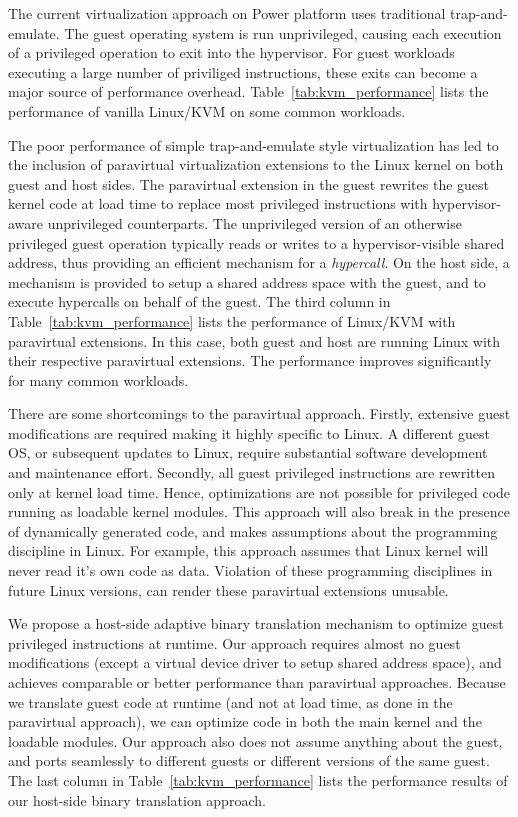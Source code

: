 \documentclass[10pt,twocolumn]{article}
\begin{document}
The current virtualization approach on Power platform uses traditional trap-and-emulate.
The guest operating system is run unprivileged, causing each execution of a privileged
operation to exit into the hypervisor. For guest workloads executing a large number
of priviliged instructions, these exits can become a major source of performance
overhead. Table~\ref{tab:kvm_performance} lists the performance of vanilla Linux/KVM
on some common workloads.

The poor performance of simple trap-and-emulate style virtualization has led to
the inclusion of paravirtual virtualization extensions to the Linux kernel on both
guest and host sides. The paravirtual extension in the guest rewrites the guest kernel
code at load time to replace most privileged instructions with
hypervisor-aware unprivileged counterparts. The unprivileged version of an
otherwise privileged guest operation typically reads or writes to a hypervisor-visible
shared address, thus providing an efficient mechanism for a {\em hypercall}.
On the host side, a mechanism is provided to setup a shared address space with the guest,
and to execute hypercalls on behalf of the guest. The third column in
Table~\ref{tab:kvm_performance} lists the performance of Linux/KVM with paravirtual
extensions. In this case, both guest and host are running Linux with their respective
paravirtual extensions. The performance improves significantly for many common
workloads.

There are some shortcomings to the paravirtual approach. Firstly, extensive guest
modifications are required making it highly specific to Linux. A different
guest OS, or subsequent updates to Linux, require substantial software
development and maintenance effort. Secondly, all guest
privileged instructions are rewritten only at kernel load time. Hence,
optimizations are
not possible for privileged code running as loadable kernel modules. This
approach will also break in the presence of dynamically generated code, and makes
assumptions about the programming discipline in Linux. For example, this approach
assumes that Linux kernel will never read it's own code as data. Violation of
these programming disciplines in future Linux versions, can render these paravirtual
extensions unusable.

We propose a host-side adaptive binary translation mechanism to optimize guest
privileged instructions at runtime. Our approach requires almost no guest modifications
(except a virtual device driver to setup shared address space), and achieves
comparable or better performance than paravirtual approaches. Because we translate
guest code at runtime (and not at load time, as done in the paravirtual approach), we
can optimize code in both the main kernel and the loadable modules. Our approach also
does not assume anything about the guest, and ports seamlessly to different
guests or different versions of the same guest.
The last column in Table~\ref{tab:kvm_performance} lists the performance results of
our host-side binary translation approach.
\end{document}
